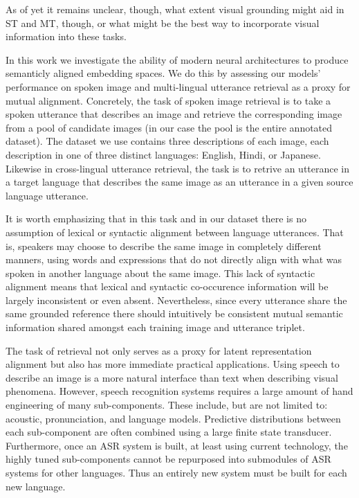 
As of yet it remains unclear, though, what extent visual grounding might aid in ST and MT, though, or what might be the best way to incorporate visual information into these tasks.

In this work we investigate the ability of modern neural architectures to produce semanticly  aligned  embedding spaces. 
We do this by assessing our models' performance on spoken image and multi-lingual utterance retrieval as a proxy for mutual alignment.
Concretely, the task of spoken image retrieval  is to take a spoken utterance that describes an image and retrieve the corresponding image from a pool of candidate images (in our case the pool is the entire annotated dataset).
The dataset we use contains three descriptions of each image, each description in one of three distinct languages: English, Hindi, or Japanese.
Likewise in cross-lingual utterance retrieval, the task is to retrive an utterance in a target language that describes the same image as an utterance in a given source language utterance.

It is worth emphasizing that in this task and in our dataset there is no assumption of lexical or syntactic alignment between language utterances.
That is, speakers may choose to describe the same image in completely different manners, 
using words and expressions that do not directly align with what was spoken in another language about the same image.
This lack of syntactic alignment means that lexical and syntactic co-occurence information will be largely inconsistent or even absent.
Nevertheless, since every utterance share the same grounded reference there should intuitively be consistent mutual semantic information shared amongst each training image and utterance triplet.

The task of retrieval not only  serves as a proxy for latent  representation alignment but also has more immediate practical applications.
Using speech to describe an image is a more natural interface than text when describing visual phenomena.
However, speech recognition systems requires a large amount of hand engineering of many sub-components.
These include, but are not limited to: acoustic, pronunciation, and language models. 
Predictive distributions between each sub-component are often combined using a large finite state transducer.
Furthermore, once an ASR system is built, at least using current technology, the highly tuned sub-components cannot be repurposed into submodules of ASR systems for other languages. 
Thus an entirely new system must be built for each new language.

